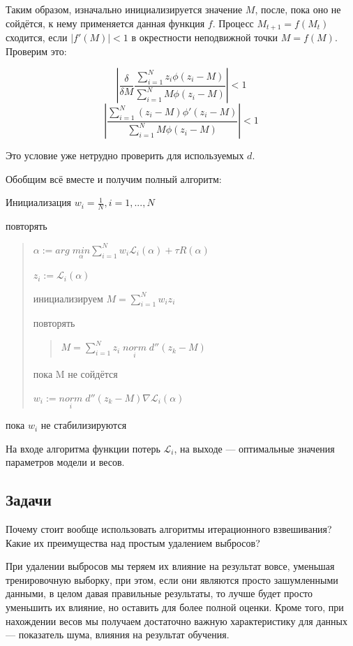 Таким образом, изначально инициализируется значение $M$, после, пока оно не сойдётся, к нему применяется данная функция $f$. Процесс $M_{t+1} = f(M_t)$ сходится, если $|f'(M)| < 1$ в окрестности неподвижной точки $M = f(M)$. Проверим это:

$$\left|\frac{\delta}{\delta M} \frac{\sum_{i=1}^N z_i \phi(z_i - M)}{\sum_{i=1}^N M \phi(z_i - M)}\right| < 1$$
$$\left|\frac{\sum_{i=1}^N (z_i - M) \phi'(z_i - M)}{\sum_{i=1}^N M \phi(z_i - M)}\right| < 1$$

Это условие уже нетрудно проверить для используемых $d$.

Обобщим всё вместе и получим полный алгоритм:

Инициализация $w_i = \frac{1}{N}, i = 1,...,N$

повторять
\begin{quote}
    $\alpha := arg \; \underset{\alpha}{min} \sum_{i=1}^N w_i \mathscr{L}_i(\alpha) + \tau R(\alpha)$\

    $z_i := \mathscr{L}_i(\alpha)$\

    инициализируем $M = \sum_{i=1}^N w_i z_i$\

    повторять\
    \begin{quote}
        $M = \sum_{i=1}^N z_i \; \underset{i}{norm} \; d''(z_k - M)$\
    \end{quote}

    пока M не сойдётся\

    $w_i := \underset{i}{norm} \; d''(z_k - M) \nabla \mathscr{L}_i(\alpha)$ \

\end{quote}

пока $w_i$ не стабилизируются

На входе алгоритма функции потерь $\mathscr{L}_i$, на выходе — оптимальные значения параметров модели и весов.

\subsection{Задачи}

\problem

Почему стоит вообще использовать алгоритмы итерационного взвешивания? Какие их преимущества над простым удалением выбросов?

\begin{solution}
    При удалении выбросов мы теряем их влияние на результат вовсе, уменьшая тренировочную выборку, при этом, если они являются просто зашумленными данными, в целом давая правильные результаты, то лучше будет просто уменьшить их влияние, но оставить для более полной оценки. Кроме того, при нахождении весов мы получаем достаточно важную характеристику для данных — показатель шума, влияния на результат обучения.
\end{solution}

